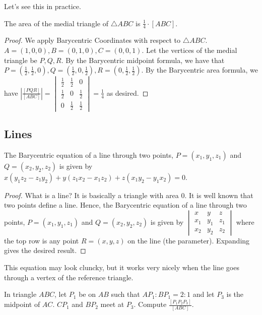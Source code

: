 \documentclass[11pt]{scrartcl}
\begin{document}
Let's see this in practice.

\begin{theorem}
    The area of the medial triangle of $\triangle ABC$ is $\frac 14 \cdot [ABC]$.
\end{theorem}

\begin{proof}
    We apply Barycentric Coordinates with respect to $\triangle ABC$. $A=(1,0,0),B=(0,1,0),C=(0,0,1)$. Let the vertices of the medial triangle be $P,Q,R$. By the Barycentric midpoint formula, we have that $P=(\frac 12,\frac 12,0),Q=(\frac 12,0,\frac 12),R=(0,\frac 12,\frac 12)$. By the Barycentric area formula, we have $|\frac{[PQR]}{[ABC]}|=
\begin{vmatrix}
\frac 12 &\frac 12  &0 \\ 
\frac 12 &0 &\frac 12 \\ 
 0& \frac 12 & \frac 12
\end{vmatrix}=\frac 14$ as desired.
\end{proof}
    
\subsection{Lines}

\begin{theorem}
    The Barycentric equation of a line through two points, $P=(x_1,y_1,z_1)$ and $Q=(x_2,y_2,z_2)$ is given by $x(y_1z_2 -z_1y_2)+y(z_1x_2-x_1z_2)+z(x_1y_2-y_1x_2)=0$.
\end{theorem}

\begin{proof}
What is a line? It is basically a triangle with area $0$. It is well known that two points define a line. Hence, the Barycentric equation of a line through two points, $P=(x_1,y_1,z_1)$ and $Q=(x_2,y_2,z_2)$ is given by
        $\begin{vmatrix}
x &y  &z \\ 
x_{1} &y_{1}  &z_{1} \\ 
 x_{2}& y_{2} & z_{2}
\end{vmatrix}$ where the top row is any point $R=(x,y,z)$ on the line (the parameter). Expanding gives the desired result.
\end{proof}

This equation may look cluncky, but it works very nicely when the line goes through a vertex of the reference triangle.

\begin{exercise}
    In triangle $ABC$, let $P_{1}$ be on $AB$ such that $AP_1:BP_1=2:1$ and let $P_3$ is the midpoint of $AC$. $CP_1$ and $BP_2$ meet at $P_3$. Compute $\frac{[P_{1}P_{2}P_{3}]}{[ABC]}$.
\end{exercise}
\end{document}
